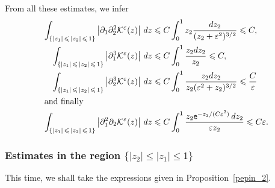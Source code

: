 \documentclass[10pt]{amsart}
\theoremstyle{definition}\newtheorem{defi}[theo]{Definition}\newtheorem{rema}[theo]{Remark}\newtheorem{exam}[theo]{Example}\newtheorem{exem}[theo]{Example}\newtheorem{nota}[theo]{Notation}
\newcommand*\p{\partial}
\newcommand*\BK{\mathcal{K}}
\newcommand*\ex{{\sf e}}
\newcommand*\ls{\leqslant }
\newcommand*\e{\varepsilon}
\begin{document}
From all these estimates, we infer
\begin{align*}
\int_{\left\{ |z_1 |\,\ls\,|z_2|\,\ls\,1\right\}} \left\lvert \p_1 \p_2^2 \BK^\e (z) \right\rvert \, dz
&\ls C \int_0^1 z_2 \frac{dz_2 }{ (z_2+\e^2)^{3/2}}
\ls C,
\\
\int_{\left\{ |z_1 |\,\ls\,|z_2|\,\ls\,1\right\}} \left\lvert \p_1^3 \BK^\e (z) \right\rvert \, dz
&\ls C \int_0^1 \frac{ z_2 dz_2 }{ z_2 }
\ls C,
\\
\int_{\left\{ |z_1 |\,\ls\,|z_2|\,\ls\,1\right\}} \left\lvert \p_2^3 \BK^\e (z) \right\rvert \, dz
&\ls C \int_0^1 \frac{ z_2 dz_2 }{ z_2 (\e^2 + z_2)^{3/2}}
\ls \frac{ C}{\e}
\\
\intertext{and finally}
\int_{\left\{ |z_1 |\,\ls\,|z_2|\,\ls\,1\right\}} \left\lvert \p_1^2 \p_2 \BK^\e (z) \right\rvert \, dz &\ls C \int_0^1 \frac{ z_2 \ex^{ - z_2 /(C\e^2) } \, dz_2}{ \e z_2 }
\ls C \e.
\end{align*}



\subsubsection{Estimates in the region \texorpdfstring{$\{ |z_2 | \ls |z_1| \ls 1 \} $}{{ |z2 | ls |z1| ls 1 } }}

This time, we shall take the expressions given in Proposition~\ref{pepin_2}.
\end{document}

